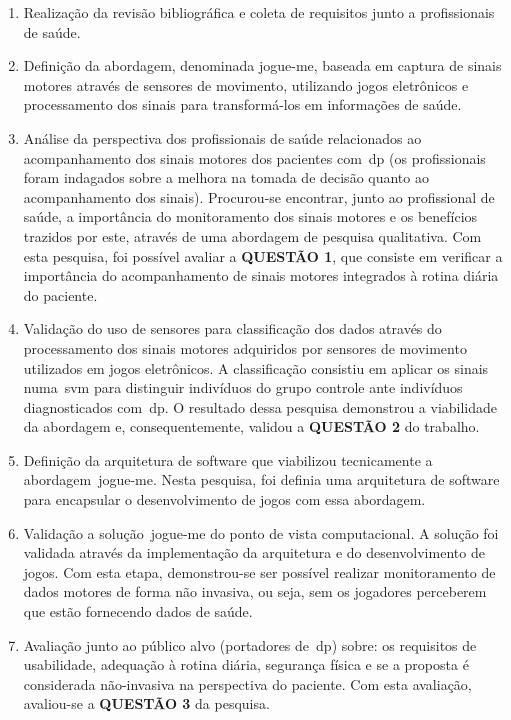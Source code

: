 \begin{enumerate}

\item{Realização da revisão bibliográfica e coleta de requisitos junto a profissionais de saúde.}

\item{Definição da abordagem, denominada \ac{jogue-me}, baseada em captura de sinais motores através de sensores de movimento, utilizando jogos eletrônicos e processamento dos sinais para transformá-los em informações de saúde.}


\item{Análise da perspectiva dos profissionais de saúde relacionados ao acompanhamento dos sinais motores dos pacientes com~\ac{dp} (os profissionais foram indagados sobre a melhora na tomada de decisão quanto ao acompanhamento dos sinais). Procurou-se encontrar, junto ao profissional de saúde, a importância do monitoramento dos sinais motores e os benefícios trazidos por este, através de uma abordagem de pesquisa qualitativa. Com esta pesquisa, foi possível avaliar a \textbf{QUESTÃO 1}, que consiste em verificar a importância do acompanhamento de sinais motores integrados à rotina diária do paciente.}

\item{Validação do uso de sensores para classificação dos dados através do processamento dos sinais motores adquiridos por sensores de movimento utilizados em jogos eletrônicos. A classificação consistiu em aplicar os sinais numa~\ac{svm} para distinguir indivíduos do grupo controle ante indivíduos diagnosticados com~\ac{dp}.
O resultado dessa pesquisa demonstrou a viabilidade da abordagem e, consequentemente, validou a \textbf{QUESTÃO 2} do trabalho.}

\item{Definição da arquitetura de software que viabilizou tecnicamente a abordagem~\ac{jogue-me}. Nesta pesquisa, foi definia uma arquitetura de software para encapsular o desenvolvimento de jogos com essa abordagem.}

\item{Validação a solução~\ac{jogue-me} do ponto de vista computacional. A solução foi validada através da implementação da arquitetura e do desenvolvimento de jogos. Com esta etapa, demonstrou-se ser possível realizar monitoramento de dados motores de forma não invasiva, ou seja, sem os jogadores perceberem que estão fornecendo dados de saúde.}

\item{Avaliação junto ao público alvo (portadores de~\ac{dp}) sobre: os requisitos de usabilidade, adequação à rotina diária, segurança física e se a proposta é considerada não-invasiva na perspectiva do paciente. Com esta avaliação, avaliou-se a \textbf{QUESTÃO 3} da pesquisa.}

\end{enumerate}

